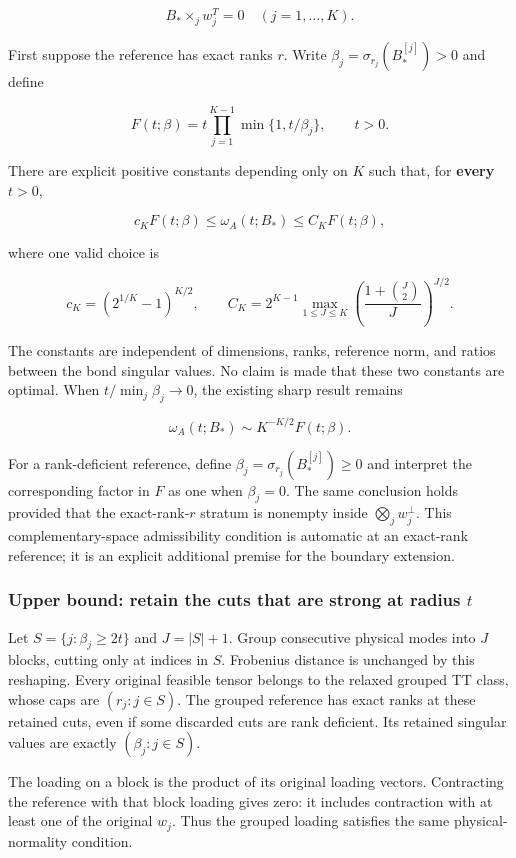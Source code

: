 \documentclass[
  11pt,
]{article}
\begin{document}
\[B_*\times_j w_j^T=0\quad(j=1,\ldots,K).\]

First suppose the reference has exact ranks \(r\). Write
\(\beta_j=\sigma_{r_j}(B_*^{[j]})>0\) and define

\[F(t;\beta)=t\prod_{j=1}^{K-1}\min\{1,t/\beta_j\},\qquad t>0.\]

There are explicit positive constants depending only on \(K\) such that,
for \textbf{every} \(t>0\),

\[c_K F(t;\beta)\le\omega_A(t;B_*)\le C_K F(t;\beta),\tag{U1}\]

where one valid choice is

\[c_K=(2^{1/K}-1)^{K/2},\qquad
C_K=2^{K-1}\max_{1\le J\le K}
\left(\frac{1+\binom J2}{J}\right)^{J/2}.\]

The constants are independent of dimensions, ranks, reference norm, and
ratios between the bond singular values. No claim is made that these two
constants are optimal. When \(t/\min_j\beta_j\to0\), the existing sharp
result remains

\[\omega_A(t;B_*)\sim K^{-K/2}F(t;\beta).\]

For a rank-deficient reference, define
\(\beta_j=\sigma_{r_j}(B_*^{[j]})\ge0\) and interpret the corresponding
factor in \(F\) as one when \(\beta_j=0\). The same conclusion holds
provided that the exact-rank-\(r\) stratum is nonempty inside
\(\bigotimes_j w_j^\perp\). This complementary-space admissibility
condition is automatic at an exact-rank reference; it is an explicit
additional premise for the boundary extension.

\subsubsection{\texorpdfstring{Upper bound: retain the cuts that are
strong at radius
\(t\)}{Upper bound: retain the cuts that are strong at radius t}}\label{upper-bound-retain-the-cuts-that-are-strong-at-radius-t}

Let \(S=\{j:\beta_j\ge2t\}\) and \(J=|S|+1\). Group consecutive physical
modes into \(J\) blocks, cutting only at indices in \(S\). Frobenius
distance is unchanged by this reshaping. Every original feasible tensor
belongs to the relaxed grouped TT class, whose caps are
\((r_j:j\in S)\). The grouped reference has exact ranks at these
retained cuts, even if some discarded cuts are rank deficient. Its
retained singular values are exactly \((\beta_j:j\in S)\).

The loading on a block is the product of its original loading vectors.
Contracting the reference with that block loading gives zero: it
includes contraction with at least one of the original \(w_j\). Thus the
grouped loading satisfies the same physical-normality condition.
\end{document}
